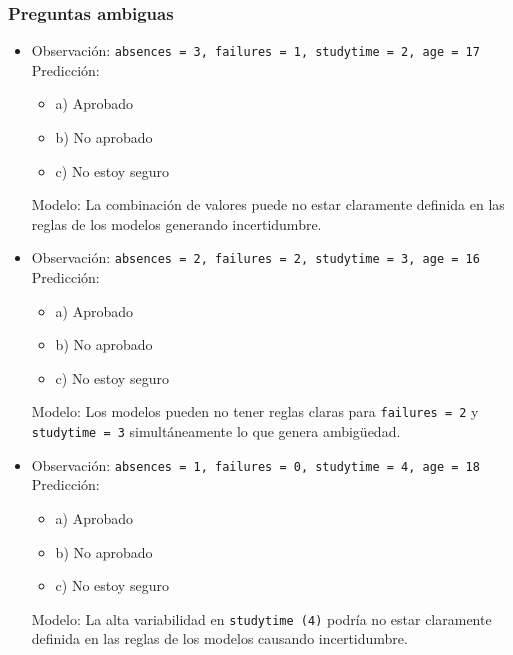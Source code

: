 \subsubsection{Preguntas ambiguas}
\begin{itemize}
    \item Observación: \texttt{absences = 3, failures = 1, studytime = 2, age = 17}\\
    Predicción:
    \begin{itemize}
        \item a) Aprobado
        \item b) No aprobado
        \item c) No estoy seguro
    \end{itemize}
    Modelo: La combinación de valores puede no estar claramente definida en las reglas de los modelos generando incertidumbre.

    \item Observación: \texttt{absences = 2, failures = 2, studytime = 3, age = 16}\\
    Predicción:
    \begin{itemize}
        \item a) Aprobado
        \item b) No aprobado
        \item c) No estoy seguro
    \end{itemize}
    Modelo: Los modelos pueden no tener reglas claras para \texttt{failures = 2} y \texttt{studytime = 3} simultáneamente lo que genera ambigüedad.

    \item Observación: \texttt{absences = 1, failures = 0, studytime = 4, age = 18}\\
    Predicción:
    \begin{itemize}
        \item a) Aprobado
        \item b) No aprobado
        \item c) No estoy seguro
    \end{itemize}
    Modelo: La alta variabilidad en \texttt{studytime (4)} podría no estar claramente definida en las reglas de los modelos causando incertidumbre.
\end{itemize}


